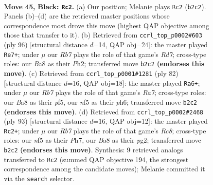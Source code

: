 \documentclass[11pt]{article}
\begin{document}
\clearpage

\begin{figure}[p]\centering
\begin{subfigure}{0.46\textwidth}\centering
\resizebox{\linewidth}{!}{%
\newchessgame
\chessboard[
  setfen={b4k2/P4p1K/8/4PN1P/8/R4p2/1r6/8 b - - 1 45},
  showmover=false,
  pgfstyle=straightmove, color=movearrow, markmove={b2-c2}
]}
\caption{}
\end{subfigure}\hfill
\begin{subfigure}{0.46\textwidth}\centering
\resizebox{\linewidth}{!}{%
\newchessgame
\chessboard[
  setfen={8/3R4/7p/8/r4PP1/p4K2/7P/4k3 w - - 7 49},
  showmover=false,
  pgfstyle=straightmove, color=movearrow, markmove={d7-e7}
]}
\caption{}
\end{subfigure}
\\[4pt]
\begin{subfigure}{0.46\textwidth}\centering
\resizebox{\linewidth}{!}{%
\newchessgame
\chessboard[
  setfen={8/R7/3k2pp/5p2/1r3P2/7P/5P2/6K1 w - - 0 42},
  showmover=false,
  pgfstyle=straightmove, color=movearrow, markmove={a7-a6}
]}
\caption{}
\end{subfigure}\hfill
\begin{subfigure}{0.46\textwidth}\centering
\resizebox{\linewidth}{!}{%
\newchessgame
\chessboard[
  setfen={6k1/6pp/8/1p2R3/1P6/8/4K1PP/2r5 b - - 5 47},
  showmover=false,
  pgfstyle=straightmove, color=movearrow, markmove={c1-c2}
]}
\caption{}
\end{subfigure}
\caption{\textbf{Move 45, Black: \texttt{Rc2}.} (a) Our position; Melanie plays \texttt{Rc2} (\texttt{b2c2}). Panels (b)--(d) are the retrieved master positions whose correspondence most drove this move (highest QAP objective among those that transfer to it). (b) Retrieved from \texttt{ccrl\_top\_p0002\#603} (ply 96) [structural distance $d$=14, QAP obj=24]: the master played \texttt{Re7+}; under $\mu$ our \emph{Rb7} plays the role of that game's \emph{Rd7}; cross-type roles: our \emph{B}a8 as their \emph{P}h2; transferred move \texttt{b2c2} \textbf{(endorses this move)}. (c) Retrieved from \texttt{ccrl\_top\_p0001\#1281} (ply 82) [structural distance $d$=16, QAP obj=18]: the master played \texttt{Ra6+}; under $\mu$ our \emph{Rb7} plays the role of that game's \emph{Ra7}; cross-type roles: our \emph{B}a8 as their \emph{p}f5, our \emph{n}f5 as their \emph{p}h6; transferred move \texttt{b2c2} \textbf{(endorses this move)}. (d) Retrieved from \texttt{ccrl\_top\_p0002\#2468} (ply 93) [structural distance $d$=16, QAP obj=12]: the master played \texttt{Rc2+}; under $\mu$ our \emph{Rb7} plays the role of that game's \emph{Rc8}; cross-type roles: our \emph{n}f5 as their \emph{P}h7, our \emph{B}a8 as their \emph{p}g2; transferred move \texttt{b2c2} \textbf{(endorses this move)}. Synthesis: 9 retrieved analogs transferred to \texttt{Rc2} (summed QAP objective 194, the strongest correspondence among the candidate moves); Melanie committed it via the \texttt{search} selector.}
\label{fig:thought-m89}
\end{figure}
\end{document}
